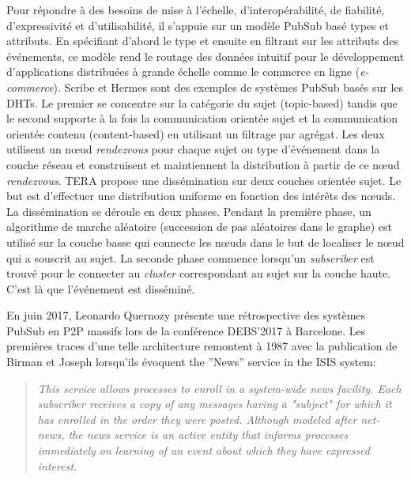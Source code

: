 Pour répondre à des besoins de mise à l'échelle, d'interopérabilité, de fiabilité, 
d'expressivité et d'utilisabilité, il s'appuie sur un modèle \gls{PubSub} basé types et 
attributs. 
En spécifiant d'abord le type et ensuite en filtrant sur les attributs des 
événements, ce modèle rend le routage des données intuitif pour le 
développement d'applications distribuées à grande échelle comme le commerce en 
ligne (\textit{e-commerce}). 
Scribe \cite{Castro2002} et Hermes \cite{Pietzuch2002} sont des exemples de 
systèmes \gls{PubSub} basés sur les \glspl{DHT}. 
Le premier se concentre sur la catégorie du sujet (topic-based) tandis que le second 
supporte à la fois la communication orientée sujet et la communication orientée contenu (content-based) en utilisant un 
filtrage par agrégat. Les deux utilisent un n\oe ud \textit{rendezvous} pour chaque 
sujet ou type d'événement dans la couche réseau et construisent et maintiennent la 
distribution à partir de ce n\oe ud \textit{rendezvous}. TERA \cite{Baldoni2007} 
propose une dissémination sur deux couches orientée sujet. Le but est d'effectuer 
une distribution uniforme en fonction des intérêts des n\oe uds. La dissémination 
se déroule en deux phases. Pendant la première phase, un algorithme de marche aléatoire (succession de pas aléatoires dans le graphe)
est utilisé sur la couche basse qui connecte les n\oe uds dans le but de localiser 
le n\oe ud qui a souscrit au sujet. La seconde phase commence lorsqu'un 
\textit{subscriber} est trouvé pour le connecter au \textit{cluster} correspondant au 
sujet sur la couche haute. C'est là que l'événement est disséminé.

En juin 2017, Leonardo Quernozy présente une rétrospective des systèmes 
\gls{PubSub} en \gls{P2P} massifs lors de la conférence DEBS'2017 à 
Barcelone. 
Les premières traces d'une telle architecture remontent à 1987 avec 
la publication de Birman et Joseph \cite{Birman1987} lorsqu'ils évoquent \og 
the ''News'' service in the ISIS system\fg{}:

\blockcquote{Birman1987}{
	\og\textit{ This service allows processes to enroll in a 
		system-wide news facility. Each subscriber receives a
		copy of any messages having a "subject" for which it 
		has enrolled in the order they were posted. Although 
		modeled after net-news, the news service is an active 
		entity that informs processes immediately on learning 
		of an event about which they have expressed interest.}\fg{}
}

